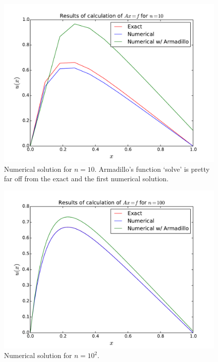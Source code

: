 \documentclass[english, 11pt]{article}
\begin{document}
\begin{figure}[H]
    \centering
    \includegraphics[width = .9\textwidth]{d_n_10.pdf}
    \caption{Numerical solution for $n=10$. Armadillo's function `solve' is pretty far off from the exact and the first numerical solution.}
    \label{fig:sol101}
\end{figure}

\begin{figure}[H]
    \centering
    \includegraphics[width = .9\textwidth]{d_n_100.pdf}
    \caption{Numerical solution for $n=10^2$.}
    \label{fig:sol102}
\end{figure}
\end{document}
